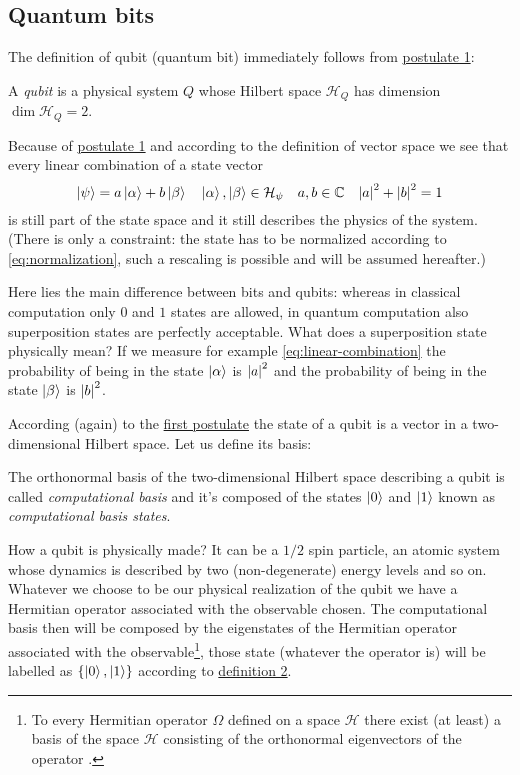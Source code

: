 
\subsection{Quantum bits}
The definition of qubit (quantum bit) immediately follows from \hyperref[postulate:1]{postulate 1}:
\begin{defn}
A \emph{qubit} is a physical system $Q$ whose Hilbert space $\mathcal{H}_Q$ has dimension $\dim\mathcal{H}_Q = 2$.
\end{defn}
Because of \hyperref[postulate:1]{postulate 1} and according to the definition of vector space we see that every linear combination of a state vector
\begin{equation}\label{eq:linear-combination}
  \ket{\psi} = a \ket{\alpha} + b \ket{\beta} \quad \ket{\alpha},\ket{\beta} \in \mathcal{H}_\psi \quad a,b \in \mathbb{C} \quad \abs*{a}^2 + \abs*{b}^2 = 1
\end{equation}
is still part of the state space and it still describes the physics of the system. (There is only a constraint: the state has to be normalized according to \eqref{eq:normalization}, such a rescaling is possible and will be assumed hereafter.) 


Here lies the main difference between bits and qubits: whereas in classical computation only $0$ and $1$ states are allowed, in quantum computation also superposition states are perfectly acceptable. 
What does a superposition state physically mean? If we measure for example \eqref{eq:linear-combination} the probability of being in the state $\ket{\alpha}$ is  $\abs*{a}^2$ and the probability of being in the state $\ket{\beta}$ is $\abs*{b}^2$.

According (again) to the \hyperref[postulate:1]{first postulate} the state of a qubit is a vector in a two-dimensional Hilbert space. Let us define its basis:
\begin{defn}\label{def:computational-basis}
The orthonormal basis of the two-dimensional Hilbert space describing a qubit is called \emph{computational basis} and it's composed of the states $\ket{0}$ and $\ket{1}$ known as \emph{computational basis states}.
\end{defn}
How a qubit is physically made?
It can be a $1/2$ spin particle, an atomic system whose dynamics is described by two (non-degenerate) energy levels and so on.
Whatever we choose to be our physical realization of the qubit we have a Hermitian operator associated with the observable chosen. The computational basis then will be composed by the eigenstates of the Hermitian operator associated with the observable\footnote{To every Hermitian operator $\Omega$ defined on a space $\mathcal{H}$ there exist (at least) a basis of the space $\mathcal{H}$ consisting of the orthonormal eigenvectors of the operator \cite[36]{Shankar}.}, those state (whatever the operator is) will be labelled as $\{\ket{0},\ket{1}\}$ according to \hyperref[def:computational-basis]{definition 2}.


